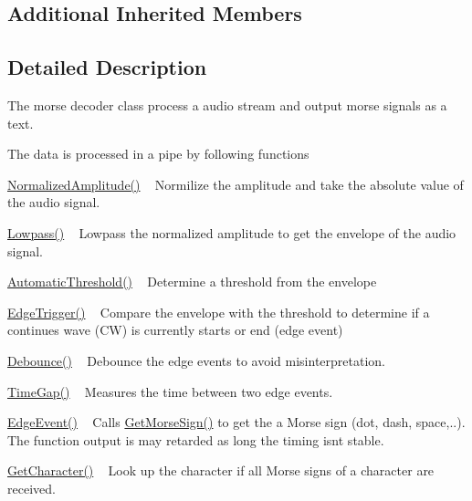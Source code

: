\subsection*{Additional Inherited Members}


\subsection{Detailed Description}
The morse decoder class process a audio stream and output morse signals as a text. 

The data is processed in a pipe by following functions
\begin{DoxyEnumerate}
\item \hyperlink{classMorseDecode_afbe9abff356a2889ad38e252c2726d07}{Normalized\+Amplitude()} ~\newline
 Normilize the amplitude and take the absolute value of the audio signal.
\item \hyperlink{classMorseDecode_a04527008e5818221448f082ec516928c}{Lowpass()} ~\newline
 Lowpass the normalized amplitude to get the envelope of the audio signal.
\item \hyperlink{classMorseDecode_af21aeb2136d254ee6fb0139c25dd5d9a}{Automatic\+Threshold()} ~\newline
 Determine a threshold from the envelope
\item \hyperlink{classMorseDecode_a64943543f9a4f2d7a567a59239563adf}{Edge\+Trigger()} ~\newline
 Compare the envelope with the threshold to determine if a continues wave (CW) is currently starts or end (edge event)
\item \hyperlink{classMorseDecode_af7e53eff848faf9e57bb7ae660f2911b}{Debounce()} ~\newline
 Debounce the edge events to avoid misinterpretation.
\item \hyperlink{classMorseDecode_a90f76d35c56413f35f59fa88e4c0a95c}{Time\+Gap()} ~\newline
 Measures the time between two edge events.
\item \hyperlink{classMorseDecode_ad02e7621b4c4e8a5b766dc4f4f31fa05}{Edge\+Event()} ~\newline
 Calls \hyperlink{classMorseDecode_aff88997ef0a7621027bab01be18473a0}{Get\+Morse\+Sign()} to get the a Morse sign (dot, dash, space,..). The function output is may retarded as long the timing isn\textquotesingle{}t stable.
\item \hyperlink{classMorseDecode_a1d3c6ce0ee7c17c55e6ca102a4a6049a}{Get\+Character()} ~\newline
 Look up the character if all Morse signs of a character are received.
\end{DoxyEnumerate}


